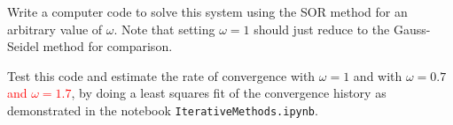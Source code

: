 \documentclass[10pt]{article}
\begin{document}
Write a computer code to solve this system using the SOR method for an
arbitrary value of $\omega$.  Note that setting $\omega = 1$ should just
reduce to the Gauss-Seidel method for comparison.  

Test this code and estimate the rate of convergence with $\omega = 1$ and
with $\omega = 0.7$ \textcolor{red}{and $\omega = 1.7$}, 
by doing a least squares fit of the convergence
history as demonstrated in the notebook {\tt IterativeMethods.ipynb}.





\end{document}
